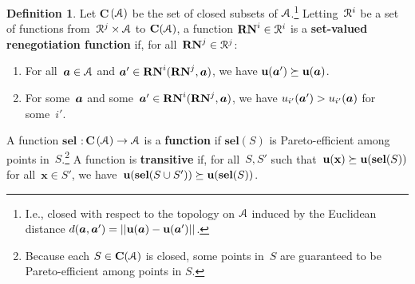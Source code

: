 \documentclass[sigconf]{aamas}
\newcommand{\selection}{sel}%
\newcommand{\renegb}{\mathbf{\selection}}
\theoremstyle{definition}
\newtheorem{definition}{Definition} %
\begin{document}
\begin{definition}
Let
${\mathbf{C}}$ $\hspace{-0.8mm} (\mathcal{A})$ be the set of
closed
subsets of $\mathcal{A}$.\footnote{I.e., closed with respect to the topology on $\mathcal{A}$
induced by the Euclidean distance $d(\boldsymbol{a},\boldsymbol{a}') = ||\textbf{u}(\boldsymbol{a}) - \textbf{u}(\boldsymbol{a}')||$.}
Letting~$\mathcal{R}^{i}$
be a set of functions
from~$\mathcal{R}^{j} \times \mathcal{A}$
to $\mathbf{C}(\mathcal{A})$,
a function 
$\mathbf{RN}^{i} \in \mathcal{R}^{i}$
is a \textbf{set-valued renegotiation
function}
if, 
for all~$\mathbf{RN}^{j} \in \mathcal{R}^{j}$:
\begin{enumerate}
    \item 
    For all~$\boldsymbol{a} \in \mathcal{A}$ and $\boldsymbol{a}' \in \mathbf{RN}^{i}(\mathbf{RN}^{j}, \boldsymbol{a})$,
    we have
    $\textbf{u}(\boldsymbol{a}') \succeq \textbf{u}(\boldsymbol{a})$. 
    \item
     For some~$\boldsymbol{a}$
    and some~$\boldsymbol{a}' \in \mathbf{RN}^{i}(\mathbf{RN}^{j}, \boldsymbol{a})$,
    we have
    $u_{i'}(\boldsymbol{a}') > u_{i'}(\boldsymbol{a})$
    for some~$i'$.
\end{enumerate}

A function 
$\renegb$ $: {\mathbf{C}}$ $\hspace{-0.8mm} (\mathcal{A}) \to \mathcal{A}$
is a \textbf{\selfunction{} function}
if
$\renegb({S})$ is Pareto-efficient
among points in~${S}$.\footnote{Because each ${S} \in \mathbf{C}(\mathcal{A})$
is closed,
some points in~${S}$
are guaranteed to be Pareto-efficient among points in
${S}$.}
A \selfunction{} function is \textbf{transitive}
if, for all~${S}, {S'}$ such 
that~$\fullpay(\mathbf{x}) \succeq \fullpay(\renegb({S}))$
for all~$\textbf{x} \in {S'}$,
we have~$\fullpay(\renegb({S} \cup {S'})) \succeq \fullpay(\renegb({S}))$.
\end{definition}
\end{document}
